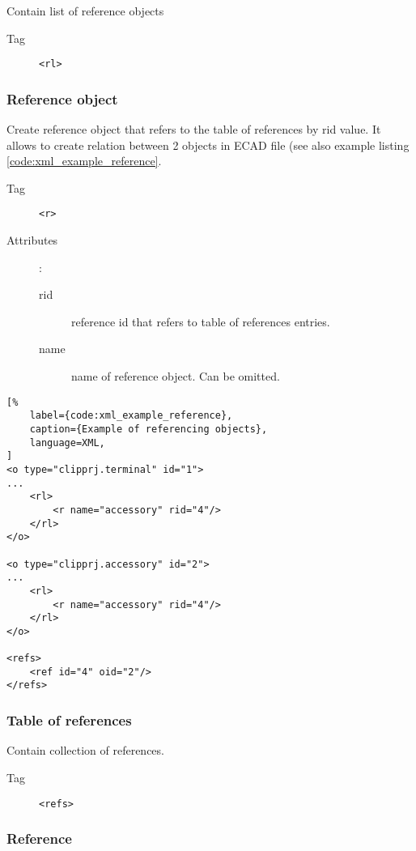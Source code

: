 \documentclass[%
	a4paper,
	oneside,
	listof=numbered,
	parskip=half,
	headsepline=true,
	footsepline=true,
	]{scrbook}
\begin{document}
Contain list of reference objects

\begin{description}
	\item[Tag] \verb|<rl>|
\end{description}

\subsubsection{Reference object}

Create reference object that refers to the table of references by rid value. It allows to create relation between 2 objects in ECAD file (see also example listing \ref{code:xml_example_reference}.

\begin{description}
	\item[Tag] \verb|<r>|
	\item[Attributes]:
	
	\begin{description}
		\item[rid] reference id that refers to table of references entries.
		\item[name] name of reference object. Can be omitted.
	\end{description}
\end{description}

\begin{lstlisting}[%
	label={code:xml_example_reference},
	caption={Example of referencing objects},
	language=XML,
]
<o type="clipprj.terminal" id="1">
...
	<rl>
		<r name="accessory" rid="4"/>
	</rl>
</o>

<o type="clipprj.accessory" id="2">
...
	<rl>
		<r name="accessory" rid="4"/>
	</rl>
</o>

<refs>
	<ref id="4" oid="2"/>
</refs>
\end{lstlisting}

\subsubsection{Table of references}

Contain collection of references.

\begin{description}
	\item[Tag] \verb|<refs>|
\end{description}

\subsubsection{Reference}
\end{document}
